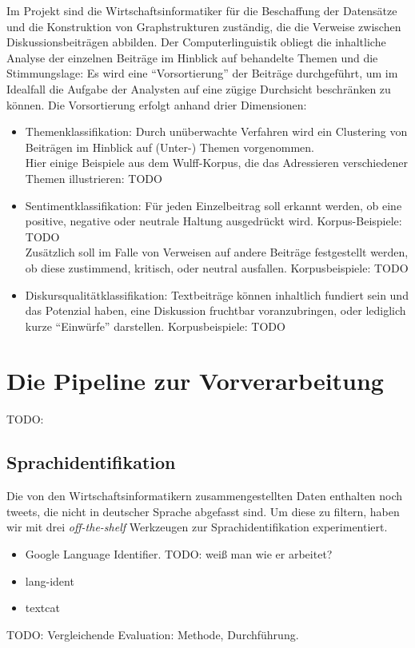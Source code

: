 \documentclass[11pt]{article}
\begin{document}
Im Projekt sind die Wirtschaftsinformatiker für die Beschaffung der
Datensätze und die Konstruktion von Graphstrukturen zuständig, die die
Verweise zwischen Diskussionsbeiträgen abbilden. Der
Computerlinguistik obliegt die inhaltliche Analyse der einzelnen
Beiträge im Hinblick auf behandelte Themen und die Stimmungslage: Es
wird eine ``Vorsortierung'' der Beiträge durchgeführt, um im Idealfall
die Aufgabe der Analysten auf eine zügige Durchsicht beschränken zu
können. Die Vorsortierung erfolgt anhand drier Dimensionen:
\begin{itemize}
\item Themenklassifikation: Durch unüberwachte Verfahren wird ein
  Clustering von Beiträgen im Hinblick auf (Unter-) Themen
  vorgenommen.\\ Hier einige Beispiele aus dem Wulff-Korpus, die das
  Adressieren verschiedener Themen illustrieren: TODO
\item Sentimentklassifikation: Für jeden Einzelbeitrag soll erkannt
  werden, ob eine positive, negative oder neutrale Haltung ausgedrückt
  wird. Korpus-Beispiele: TODO\\ Zusätzlich soll im Falle von Verweisen auf andere Beiträge
  festgestellt werden, ob diese zustimmend, kritisch, oder neutral
  ausfallen. Korpusbeispiele: TODO
\item Diskursqualitätklassifikation: Textbeiträge können inhaltlich
  fundiert sein und das Potenzial haben, eine Diskussion fruchtbar
  voranzubringen, oder lediglich kurze ``Einwürfe''
  darstellen. Korpusbeispiele: TODO
\end{itemize}


\section{Die Pipeline zur Vorverarbeitung}

TODO: 
\subsection{Sprachidentifikation}

Die von den Wirtschaftsinformatikern zusammengestellten Daten
enthalten noch tweets, die nicht in deutscher Sprache abgefasst
sind. Um diese zu filtern, haben wir mit drei {\em off-the-shelf}
Werkzeugen zur Sprachidentifikation experimentiert.

\begin{itemize}
\item Google Language Identifier. TODO: weiß man wie er arbeitet?
\item lang-ident
\item textcat
\end{itemize}
TODO: Vergleichende Evaluation: Methode, Durchführung.
\end{document}
